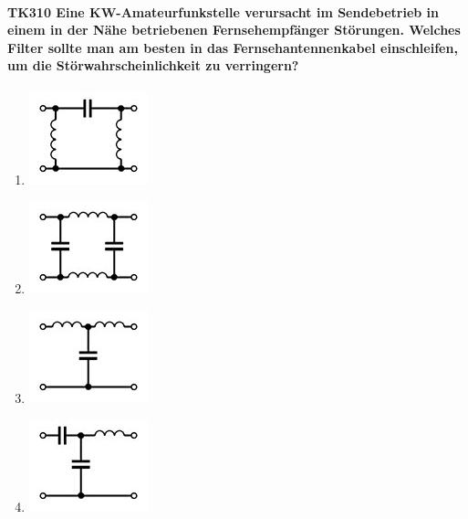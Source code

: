 \documentclass[8pt]{article}
\begin{document}
\paragraph*{TK310 Eine KW-Amateurfunkstelle verursacht im Sendebetrieb in einem in der Nähe betriebenen Fernsehempfänger Störungen. Welches Filter sollte man am besten in das Fernsehantennenkabel einschleifen, um die Störwahrscheinlichkeit zu verringern?}
\begin{enumerate}[nolistsep,label=\Alph*]
\item
\begin{center}
	\begin{minipage}{\linewidth}
		\centering
		\includegraphics[scale=1.0]{pics/tk310_a.jpg}
	\end{minipage}
\end{center}
\item
\begin{center}
	\begin{minipage}{\linewidth}
		\centering
		\includegraphics[scale=1.0]{pics/tk310_b.jpg}
	\end{minipage}
\end{center}
\item
\begin{center}
	\begin{minipage}{\linewidth}
		\centering
		\includegraphics[scale=1.0]{pics/tk310_c.jpg}
	\end{minipage}
\end{center}
\item
\begin{center}
	\begin{minipage}{\linewidth}
		\centering
		\includegraphics[scale=1.0]{pics/tk310_d.jpg}
	\end{minipage}
\end{center}
\end{enumerate}
\end{document}
